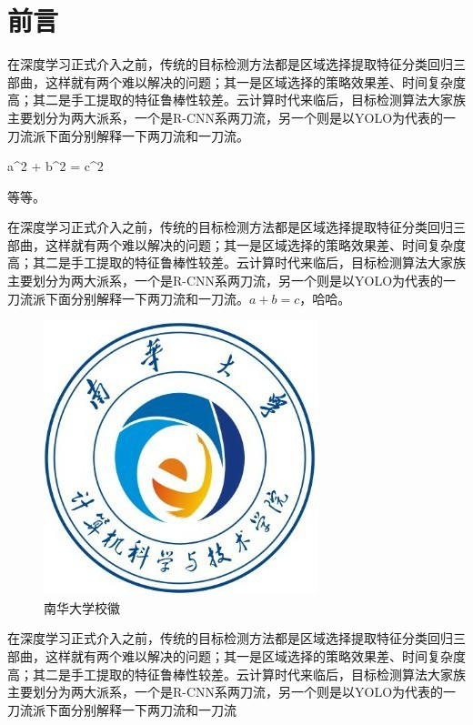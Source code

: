 \section{前言}
在深度学习正式介入之前，传统的目标检测方法都是区域选择提取特征分类回归三部曲，这样就有两个难以解决的问题；其一是区域选择的策略效果差、时间复杂度高；其二是手工提取的特征鲁棒性较差。云计算时代来临后，目标检测算法大家族主要划分为两大派系，一个是R-CNN系两刀流，另一个则是以YOLO为代表的一刀流派下面分别解释一下两刀流和一刀流。 
\begin{uscequation}
	a^2 + b^2 = c^2 
\end{uscequation}
等等。

在深度学习正式介入之前，传统的目标检测方法都是区域选择提取特征分类回归三部曲，这样就有两个难以解决的问题；其一是区域选择的策略效果差、时间复杂度高；其二是手工提取的特征鲁棒性较差。云计算时代来临后，目标检测算法大家族主要划分为两大派系，一个是R-CNN系两刀流，另一个则是以YOLO为代表的一刀流派下面分别解释一下两刀流和一刀流。$a + b = c$，哈哈。


\setcounter{figure}{0}
\begin{figure}[h]
	\centering
	\includegraphics{./Pictures/usc.png}	
	\caption{南华大学校徽}	
\end{figure}
在深度学习正式介入之前，传统的目标检测方法都是区域选择提取特征分类回归三部曲，这样就有两个难以解决的问题；其一是区域选择的策略效果差、时间复杂度高；其二是手工提取的特征鲁棒性较差。云计算时代来临后，目标检测算法大家族主要划分为两大派系，一个是R-CNN系两刀流，另一个则是以YOLO为代表的一刀流派下面分别解释一下两刀流和一刀流

